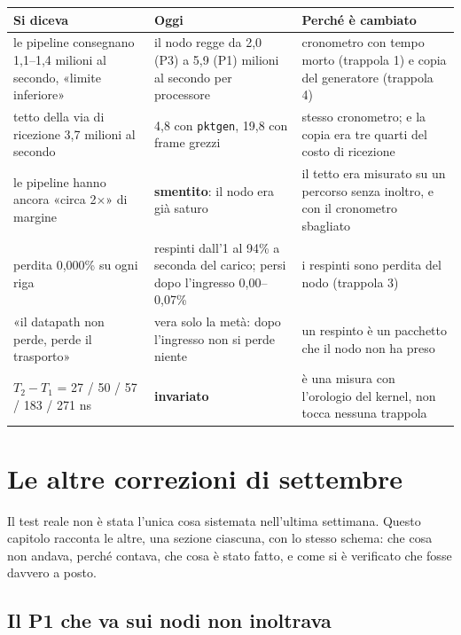 \documentclass[11pt,a4paper,oneside]{report}
\begin{document}
\begin{center}
\small
\begin{tabular}{@{}p{4.9cm}p{4.3cm}p{4.9cm}@{}}
\toprule
\textbf{Si diceva} & \textbf{Oggi} & \textbf{Perché è cambiato} \\
\midrule
le pipeline consegnano 1,1--1,4 milioni al secondo, «limite inferiore» &
  il nodo regge da 2,0 (P3) a 5,9 (P1) milioni al secondo per processore &
  cronometro con tempo morto (trappola 1) e copia del generatore (trappola 4) \\
\addlinespace
tetto della via di ricezione 3,7 milioni al secondo &
  4,8 con \texttt{pktgen}, 19,8 con frame grezzi &
  stesso cronometro; e la copia era tre quarti del costo di ricezione \\
\addlinespace
le pipeline hanno ancora «circa 2$\times$» di margine &
  \textbf{smentito}: il nodo era già saturo &
  il tetto era misurato su un percorso senza inoltro, e con il cronometro sbagliato \\
\addlinespace
perdita 0,000\% su ogni riga &
  respinti dall'1 al 94\% a seconda del carico; persi dopo l'ingresso 0,00--0,07\% &
  i respinti sono perdita del nodo (trappola 3) \\
\addlinespace
«il datapath non perde, perde il trasporto» &
  vera solo la metà: dopo l'ingresso non si perde niente &
  un respinto è un pacchetto che il nodo non ha preso \\
\addlinespace
$T_2-T_1$ = 27 / 50 / 57 / 183 / 271 ns &
  \textbf{invariato} &
  è una misura con l'orologio del kernel, non tocca nessuna trappola \\
\bottomrule
\end{tabular}
\end{center}

\chapter{Le altre correzioni di settembre}
\label{ch:altre}

Il test reale non è stata l'unica cosa sistemata nell'ultima settimana. Questo
capitolo racconta le altre, una sezione ciascuna, con lo stesso schema: che cosa
non andava, perché contava, che cosa è stato fatto, e come si è verificato che
fosse davvero a posto.

\section{Il P1 che va sui nodi non inoltrava}
\end{document}
